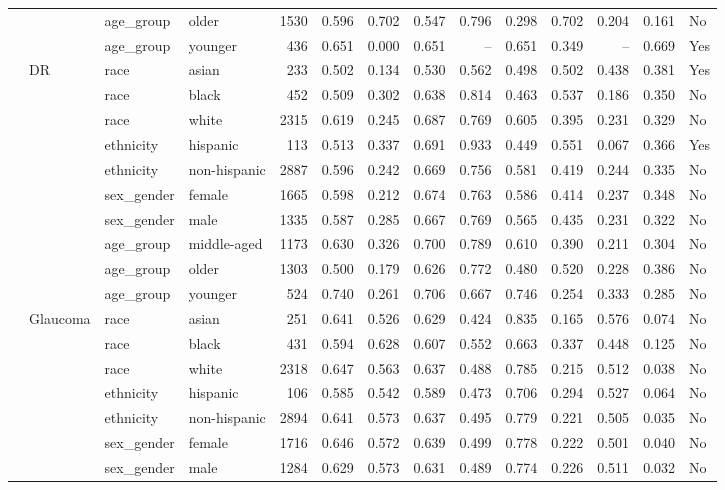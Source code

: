 \begin{longtable}{@{}lll l rrrrrrrr@{}}
 &  & age\_group & older & 1530 & 0.596 & 0.702 & 0.547 & 0.796 & 0.298 & 0.702 & 0.204 & 0.161 & No \\
 &  & age\_group & younger & 436 & 0.651 & 0.000 & 0.651 & -- & 0.651 & 0.349 & -- & 0.669 & Yes \\
 & DR & race & asian & 233 & 0.502 & 0.134 & 0.530 & 0.562 & 0.498 & 0.502 & 0.438 & 0.381 & Yes \\
 &  & race & black & 452 & 0.509 & 0.302 & 0.638 & 0.814 & 0.463 & 0.537 & 0.186 & 0.350 & No \\
 &  & race & white & 2315 & 0.619 & 0.245 & 0.687 & 0.769 & 0.605 & 0.395 & 0.231 & 0.329 & No \\
 &  & ethnicity & hispanic & 113 & 0.513 & 0.337 & 0.691 & 0.933 & 0.449 & 0.551 & 0.067 & 0.366 & Yes \\
 &  & ethnicity & non-hispanic & 2887 & 0.596 & 0.242 & 0.669 & 0.756 & 0.581 & 0.419 & 0.244 & 0.335 & No \\
 &  & sex\_gender & female & 1665 & 0.598 & 0.212 & 0.674 & 0.763 & 0.586 & 0.414 & 0.237 & 0.348 & No \\
 &  & sex\_gender & male & 1335 & 0.587 & 0.285 & 0.667 & 0.769 & 0.565 & 0.435 & 0.231 & 0.322 & No \\
 &  & age\_group & middle-aged & 1173 & 0.630 & 0.326 & 0.700 & 0.789 & 0.610 & 0.390 & 0.211 & 0.304 & No \\
 &  & age\_group & older & 1303 & 0.500 & 0.179 & 0.626 & 0.772 & 0.480 & 0.520 & 0.228 & 0.386 & No \\
 &  & age\_group & younger & 524 & 0.740 & 0.261 & 0.706 & 0.667 & 0.746 & 0.254 & 0.333 & 0.285 & No \\
 & Glaucoma & race & asian & 251 & 0.641 & 0.526 & 0.629 & 0.424 & 0.835 & 0.165 & 0.576 & 0.074 & No \\
 &  & race & black & 431 & 0.594 & 0.628 & 0.607 & 0.552 & 0.663 & 0.337 & 0.448 & 0.125 & No \\
 &  & race & white & 2318 & 0.647 & 0.563 & 0.637 & 0.488 & 0.785 & 0.215 & 0.512 & 0.038 & No \\
 &  & ethnicity & hispanic & 106 & 0.585 & 0.542 & 0.589 & 0.473 & 0.706 & 0.294 & 0.527 & 0.064 & No \\
 &  & ethnicity & non-hispanic & 2894 & 0.641 & 0.573 & 0.637 & 0.495 & 0.779 & 0.221 & 0.505 & 0.035 & No \\
 &  & sex\_gender & female & 1716 & 0.646 & 0.572 & 0.639 & 0.499 & 0.778 & 0.222 & 0.501 & 0.040 & No \\
 &  & sex\_gender & male & 1284 & 0.629 & 0.573 & 0.631 & 0.489 & 0.774 & 0.226 & 0.511 & 0.032 & No \\

\end{longtable}
